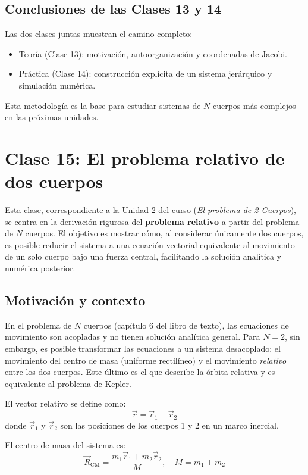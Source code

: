 \documentclass[12pt,oneside]{book}
\begin{document}
\section{Conclusiones de las Clases 13 y 14}
Las dos clases juntas muestran el camino completo:
\begin{itemize}
    \item Teoría (Clase 13): motivación, autoorganización y coordenadas de Jacobi.
    \item Práctica (Clase 14): construcción explícita de un sistema jerárquico y simulación numérica.
\end{itemize}

Esta metodología es la base para estudiar sistemas de \(N\) cuerpos más complejos en las próximas unidades.




\chapter{Clase 15: El problema relativo de dos cuerpos}

Esta clase, correspondiente a la Unidad 2 del curso (\emph{El problema de 2-Cuerpos}), se centra en la derivación rigurosa del \textbf{problema relativo} a partir del problema de \(N\) cuerpos. El objetivo es mostrar cómo, al considerar únicamente dos cuerpos, es posible reducir el sistema a una ecuación vectorial equivalente al movimiento de un solo cuerpo bajo una fuerza central, facilitando la solución analítica y numérica posterior.

\section{Motivación y contexto}
En el problema de \(N\) cuerpos (capítulo 6 del libro de texto), las ecuaciones de movimiento son acopladas y no tienen solución analítica general. Para \(N=2\), sin embargo, es posible transformar las ecuaciones a un sistema desacoplado: el movimiento del centro de masa (uniforme rectilíneo) y el movimiento \emph{relativo} entre los dos cuerpos. Este último es el que describe la órbita relativa y es equivalente al problema de Kepler.

El vector relativo se define como:
\[
\vec{r} = \vec{r}_1 - \vec{r}_2
\]
donde \(\vec{r}_1\) y \(\vec{r}_2\) son las posiciones de los cuerpos 1 y 2 en un marco inercial.

El centro de masa del sistema es:
\[
\vec{R}_{\text{CM}} = \frac{m_1 \vec{r}_1 + m_2 \vec{r}_2}{M}, \quad M = m_1 + m_2
\]
\end{document}
